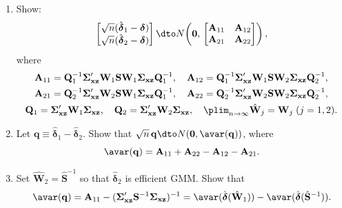 \begin{problemset}
\begin{enumerate}[label=(\alph*)]
\item Show:
  \[
    \begin{bmatrix} \sqrt{n}(\hat{\boldsymbol{\delta}}_1 - \boldsymbol{\delta}) \\
    \sqrt{n}(\hat{\boldsymbol{\delta}}_2 - \boldsymbol{\delta}) \end{bmatrix}
    \dto N\!\left(\mathbf{0},\,
    \begin{bmatrix} \mathbf{A}_{11} & \mathbf{A}_{12} \\
    \mathbf{A}_{21} & \mathbf{A}_{22} \end{bmatrix}\right),
  \]
  where
  \begin{gather*}
    \mathbf{A}_{11} = \mathbf{Q}_1^{-1} \boldsymbol{\Sigma}_{\mathbf{xz}}'
    \mathbf{W}_1 \mathbf{S} \mathbf{W}_1 \boldsymbol{\Sigma}_{\mathbf{xz}}
    \mathbf{Q}_1^{-1}, \quad
    \mathbf{A}_{12} = \mathbf{Q}_1^{-1} \boldsymbol{\Sigma}_{\mathbf{xz}}'
    \mathbf{W}_1 \mathbf{S} \mathbf{W}_2 \boldsymbol{\Sigma}_{\mathbf{xz}}
    \mathbf{Q}_2^{-1}, \\
    \mathbf{A}_{21} = \mathbf{Q}_2^{-1} \boldsymbol{\Sigma}_{\mathbf{xz}}'
    \mathbf{W}_2 \mathbf{S} \mathbf{W}_1 \boldsymbol{\Sigma}_{\mathbf{xz}}
    \mathbf{Q}_1^{-1}, \quad
    \mathbf{A}_{22} = \mathbf{Q}_2^{-1} \boldsymbol{\Sigma}_{\mathbf{xz}}'
    \mathbf{W}_2 \mathbf{S} \mathbf{W}_2 \boldsymbol{\Sigma}_{\mathbf{xz}}
    \mathbf{Q}_2^{-1}, \\
    \mathbf{Q}_1 = \boldsymbol{\Sigma}_{\mathbf{xz}}' \mathbf{W}_1
    \boldsymbol{\Sigma}_{\mathbf{xz}}, \quad
    \mathbf{Q}_2 = \boldsymbol{\Sigma}_{\mathbf{xz}}' \mathbf{W}_2
    \boldsymbol{\Sigma}_{\mathbf{xz}}, \quad
    \plim_{n\to\infty} \hat{\mathbf{W}}_j = \mathbf{W}_j \; (j = 1, 2).
  \end{gather*}

\item Let $\mathbf{q} \equiv \hat{\boldsymbol{\delta}}_1 - \hat{\boldsymbol{\delta}}_2$.
  Show that $\sqrt{n}\, \mathbf{q} \dto N(\mathbf{0}, \avar(\mathbf{q}))$, where
  \[
    \avar(\mathbf{q})
    = \mathbf{A}_{11} + \mathbf{A}_{22} - \mathbf{A}_{12} - \mathbf{A}_{21}.
  \]

\item Set $\hat{\mathbf{W}}_2 = \hat{\mathbf{S}}^{-1}$ so that $\hat{\boldsymbol{\delta}}_2$ is efficient GMM.
  Show that
  \[
    \avar(\mathbf{q})
    = \mathbf{A}_{11}
    - (\boldsymbol{\Sigma}_{\mathbf{xz}}' \mathbf{S}^{-1}
    \boldsymbol{\Sigma}_{\mathbf{xz}})^{-1}
    = \avar(\hat{\boldsymbol{\delta}}(\hat{\mathbf{W}}_1))
    - \avar(\hat{\boldsymbol{\delta}}(\hat{\mathbf{S}}^{-1})).
  \]
\end{enumerate}


\end{problemset}
